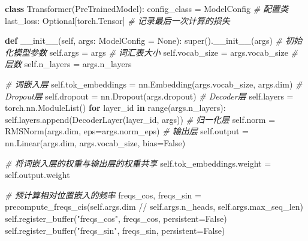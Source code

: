 \documentclass[
]{article}
\newenvironment{Shaded}{}{}
\newcommand{\BuiltInTok}[1]{\textcolor[rgb]{0.00,0.50,0.00}{#1}}
\newcommand{\CommentTok}[1]{\textcolor[rgb]{0.38,0.63,0.69}{\textit{#1}}}
\newcommand{\ControlFlowTok}[1]{\textcolor[rgb]{0.00,0.44,0.13}{\textbf{#1}}}
\newcommand{\FunctionTok}[1]{\textcolor[rgb]{0.02,0.16,0.49}{#1}}
\newcommand{\KeywordTok}[1]{\textcolor[rgb]{0.00,0.44,0.13}{\textbf{#1}}}
\newcommand{\NormalTok}[1]{#1}
\newcommand{\OperatorTok}[1]{\textcolor[rgb]{0.40,0.40,0.40}{#1}}
\newcommand{\StringTok}[1]{\textcolor[rgb]{0.25,0.44,0.63}{#1}}
\newcommand{\VariableTok}[1]{\textcolor[rgb]{0.10,0.09,0.49}{#1}}
\begin{document}
\begin{Shaded}
\begin{Highlighting}[]
\KeywordTok{class}\NormalTok{ Transformer(PreTrainedModel):}
\NormalTok{    config\_class }\OperatorTok{=}\NormalTok{ ModelConfig  }\CommentTok{\# 配置类}
\NormalTok{    last\_loss: Optional[torch.Tensor] }\CommentTok{\# 记录最后一次计算的损失}

    \KeywordTok{def} \FunctionTok{\_\_init\_\_}\NormalTok{(}\VariableTok{self}\NormalTok{, args: ModelConfig }\OperatorTok{=} \VariableTok{None}\NormalTok{):}
        \BuiltInTok{super}\NormalTok{().}\FunctionTok{\_\_init\_\_}\NormalTok{(args)}
        \CommentTok{\# 初始化模型参数}
        \VariableTok{self}\NormalTok{.args }\OperatorTok{=}\NormalTok{ args}
        \CommentTok{\# 词汇表大小}
        \VariableTok{self}\NormalTok{.vocab\_size }\OperatorTok{=}\NormalTok{ args.vocab\_size}
        \CommentTok{\# 层数}
        \VariableTok{self}\NormalTok{.n\_layers }\OperatorTok{=}\NormalTok{ args.n\_layers}

        \CommentTok{\# 词嵌入层}
        \VariableTok{self}\NormalTok{.tok\_embeddings }\OperatorTok{=}\NormalTok{ nn.Embedding(args.vocab\_size, args.dim)}
        \CommentTok{\# Dropout层}
        \VariableTok{self}\NormalTok{.dropout }\OperatorTok{=}\NormalTok{ nn.Dropout(args.dropout)}
        \CommentTok{\# Decoder层}
        \VariableTok{self}\NormalTok{.layers }\OperatorTok{=}\NormalTok{ torch.nn.ModuleList()}
        \ControlFlowTok{for}\NormalTok{ layer\_id }\KeywordTok{in} \BuiltInTok{range}\NormalTok{(args.n\_layers):}
            \VariableTok{self}\NormalTok{.layers.append(DecoderLayer(layer\_id, args))}
        \CommentTok{\# 归一化层}
        \VariableTok{self}\NormalTok{.norm }\OperatorTok{=}\NormalTok{ RMSNorm(args.dim, eps}\OperatorTok{=}\NormalTok{args.norm\_eps)}
        \CommentTok{\# 输出层}
        \VariableTok{self}\NormalTok{.output }\OperatorTok{=}\NormalTok{ nn.Linear(args.dim, args.vocab\_size, bias}\OperatorTok{=}\VariableTok{False}\NormalTok{)}

        \CommentTok{\# 将词嵌入层的权重与输出层的权重共享}
        \VariableTok{self}\NormalTok{.tok\_embeddings.weight }\OperatorTok{=} \VariableTok{self}\NormalTok{.output.weight }

        \CommentTok{\# 预计算相对位置嵌入的频率}
\NormalTok{        freqs\_cos, freqs\_sin }\OperatorTok{=}\NormalTok{ precompute\_freqs\_cis(}\VariableTok{self}\NormalTok{.args.dim }\OperatorTok{//} \VariableTok{self}\NormalTok{.args.n\_heads, }\VariableTok{self}\NormalTok{.args.max\_seq\_len)}
        \VariableTok{self}\NormalTok{.register\_buffer(}\StringTok{"freqs\_cos"}\NormalTok{, freqs\_cos, persistent}\OperatorTok{=}\VariableTok{False}\NormalTok{)}
        \VariableTok{self}\NormalTok{.register\_buffer(}\StringTok{"freqs\_sin"}\NormalTok{, freqs\_sin, persistent}\OperatorTok{=}\VariableTok{False}\NormalTok{)}


\end{Highlighting}
\end{Shaded}
\end{document}
